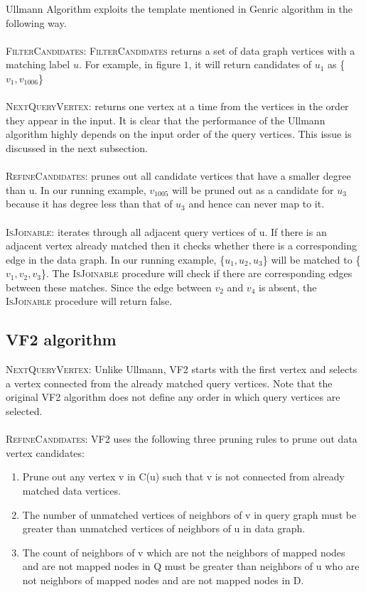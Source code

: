 \documentclass[
10pt, %
a4paper, %
oneside, %
headinclude,footinclude, %
BCOR5mm, %
]{scrartcl}
\begin{document}
Ullmann Algorithm exploits the template mentioned in Genric algorithm in the following way.\\
\\
\textsc{FilterCandidates:} \textsc{FilterCandidates} returns a set of data graph vertices with a matching label $u$. For example, in figure $1$, it will return candidates of $u_1$ as \{$v_1, v_{1006}$\}\\
\\
\textsc{NextQueryVertex:} returns one vertex at a time from the vertices in the order they appear in the input. It is clear that the performance of the Ullmann algorithm highly depends on the input order of the query vertices. This issue is discussed in the next subsection.\\
\\
\textsc{RefineCandidates:} prunes out all candidate vertices that have a smaller degree than u. In our running example, $v_{1005}$ will be pruned out as a candidate for $u_3$ because it has degree less than that of $u_3$ and hence can never map to it.\\
\\
\textsc{IsJoinable:} iterates through all adjacent query vertices of u. If there is an adjacent vertex already matched then it checks whether there is a corresponding edge in the data graph. In our running example, \{$u_1, u_2, u_3$\} will be matched to \{$v_1, v_2, v_3$\}. The \textsc{IsJoinable} procedure will check if there are corresponding edges between these matches. Since the edge between $v_2$ and $v_4$ is absent, the \textsc{IsJoinable} procedure will return false.

\subsection{VF2 algorithm\cite{vf2}}

\textsc{NextQueryVertex:} Unlike Ullmann, VF2 starts with the first vertex and selects a vertex connected from the already matched query vertices. Note that the original VF2 algorithm does not define any order in which query vertices are selected.\\
\\
\textsc{RefineCandidates:} VF2 uses the following three pruning
rules to prune out data vertex candidates:
\begin{enumerate}
    \item Prune out any vertex v in C(u) such that v is not connected from already matched data vertices.
    \item The number of unmatched vertices of neighbors of v in query graph must be greater than unmatched vertices of neighbors of u in data graph.
    \item The count of neighbors of v which are not the neighbors of mapped nodes and are not mapped nodes in Q must be greater than neighbors of u who are not neighbors of mapped nodes and are not mapped nodes in D.
\end{enumerate}
\end{document}
